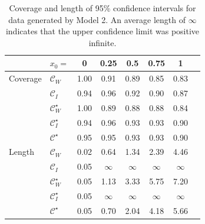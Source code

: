 \documentclass[useAMS,usenatbib,usegraphicx,referee]{biom}\usepackage[]{graphicx}\usepackage[]{color}
\begin{document}
\begin{table}[!htb]
\centering
\caption{Coverage and length of 95\% confidence intervals for data generated by Model 2. An average length of $\infty$ indicates that the upper confidence limit was positive infinite. \label{tab:results-2}}
\begin{tabular}{llcccccc}
  \toprule
            &  $x_0 =$               & 0    & 0.25 & 0.5  & 0.75 & 1 \\
  \hline
  Coverage  &  $\mathcal{C}_W$       & 1.00 & 0.91 & 0.89 & 0.85 & 0.83 \\
            &  $\mathcal{C}_I$       & 0.94 & 0.96 & 0.92 & 0.90 & 0.87 \\
            &  $\mathcal{C}^\star_W$ & 1.00 & 0.89 & 0.88 & 0.88 & 0.84 \\
            &  $\mathcal{C}^\star_I$ & 0.94 & 0.96 & 0.93 & 0.93 & 0.90 \\
            &  $\mathcal{C}^\star$   & 0.95 & 0.95 & 0.93 & 0.93 & 0.90 \\
  \hline
  Length    &  $\mathcal{C}_W$       & 0.02 & 0.64 & 1.34 & 2.39 & 4.46 \\
            &  $\mathcal{C}_I$       & 0.05 & $\infty$ & $\infty$ & $\infty$ & $\infty$ \\
            &  $\mathcal{C}^\star_W$ & 0.05 & 1.13 & 3.33 & 5.75 & 7.20 \\
            &  $\mathcal{C}^\star_I$ & 0.05 & $\infty$ & $\infty$ & $\infty$ & $\infty$ \\
            &  $\mathcal{C}^\star$   & 0.05 & 0.70 & 2.04 & 4.18 & 5.66\\
  \bottomrule
\end{tabular}\vskip18pt
\end{table}
\end{document}
